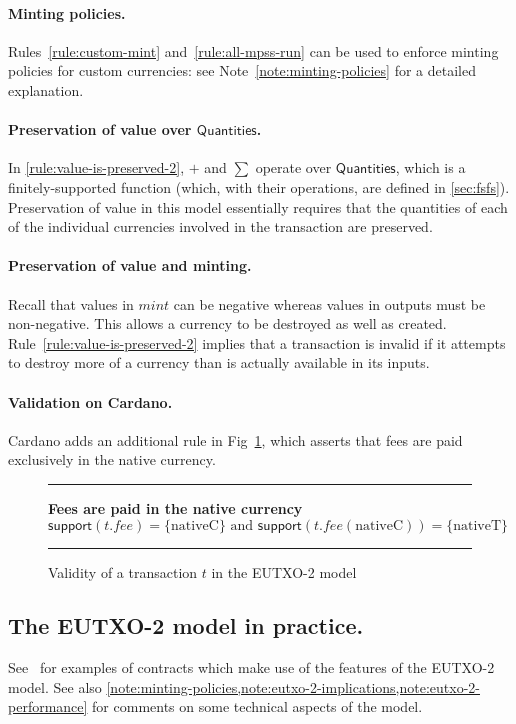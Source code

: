 \documentclass[a4paper]{article}
\newcounter{note}
\newcommand{\s}{\textsf}  %
\newcommand{\msf}[1]{\ensuremath{\mathsf{#1}}}
\newcommand{\mi}[1]{\ensuremath{\mathit{#1}}}
\newcommand\rfskip{7pt}
\newenvironment{ruledfigure}[1]{\begin{figure}[#1]\hrule\vspace{\rfskip}}{\vspace{\rfskip}\hrule\end{figure}}
\newcommand{\support}{\msf{support}}
\newcommand{\mint}{\mi{mint}}
\newcommand{\fee}{\mi{fee}}
\newcommand{\nativeCur}{\ensuremath{\mathrm{nativeC}}}
\newcommand{\nativeTok}{\ensuremath{\mathrm{nativeT}}}
\newcommand{\qtymap}{\ensuremath{\s{Quantities}}}
\begin{document}
\paragraph{Minting policies.}
Rules~\ref{rule:custom-mint} and~\ref{rule:all-mpss-run} can be used
to enforce minting policies for custom currencies: see
Note~\ref{note:minting-policies} for a detailed explanation.

\paragraph{Preservation of value over \qtymap{}.}
In \cref{rule:value-is-preserved-2},
$+$ and $\sum$ operate over \qtymap{}, which is
a finitely-supported function (which, with their operations,
are defined in \cref{sec:fsfs}). Preservation of value
in this model essentially requires that the
quantities of each of the individual currencies involved in the
transaction are preserved.

\paragraph{Preservation of value and minting.}
Recall that values in $\mint$ can be negative whereas values in
outputs must be non-negative. This allows a currency to be destroyed as
well as created. Rule~\ref{rule:value-is-preserved-2} implies that a
transaction is invalid if it attempts to destroy more of a currency
than is actually available in its inputs.

\paragraph{Validation on Cardano.}
Cardano adds an additional rule in Fig~\ref{fig:cardano-fee-validity}, which
asserts that fees are paid exclusively in the native currency.

\begin{ruledfigure}{H}
  \textbf{Fees are paid in the native currency}
  \begin{displaymath}
    \support(t.\fee) = \{ \nativeCur \} \textrm{ and }
    \support(t.\fee(\nativeCur)) = \{ \nativeTok \}
  \end{displaymath}
  \caption{Validity of a transaction $t$ in the EUTXO-2 model}
  \label{fig:cardano-fee-validity}
\end{ruledfigure}

\subsection{The EUTXO-2 model in practice.}
See~\cite{Plutus-book} for examples of contracts which make use of the
features of the EUTXO-2 model.  See also
\cref{note:minting-policies,note:eutxo-2-implications,note:eutxo-2-performance}
for comments on some technical aspects of the model.
\end{document}

